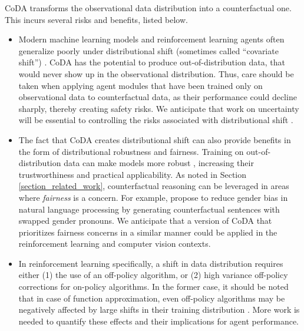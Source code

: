 \documentclass{article}
\begin{document}
CoDA transforms the observational data distribution into a counterfactual one. This incurs several risks and benefits, listed below. 
\begin{itemize}[leftmargin=0.3in,labelsep=0.1in]
\item Modern machine learning models and reinforcement learning agents often generalize poorly under distributional shift (sometimes called ``covariate shift'') \cite{li2018learning,cobbe2018quantifying}. CoDA has the potential to produce out-of-distribution data, that would never show up in the observational distribution. Thus, care should be taken when applying agent modules that have been trained only on observational data to counterfactual data, as their performance could decline sharply, thereby creating safety risks. We anticipate that work on uncertainty will be essential to controlling the risks associated with distributional shift \cite{snoek2019can}.
\item The fact that CoDA creates distributional shift can also provide benefits in the form of distributional robustness and fairness. Training on out-of-distribution data can make models more robust \cite{sinha2017certifying}, increasing their trustworthiness and practical applicability. As noted in Section \ref{section_related_work}, counterfactual reasoning can be leveraged in areas where \emph{fairness} is a concern. For example, \citep{park2018reducing} propose to reduce gender bias in natural language processing by generating counterfactual sentences with swapped gender pronouns. We anticipate that a version of CoDA that prioritizes fairness concerns in a similar manner could be applied in the reinforcement learning and computer vision contexts. 
\item In reinforcement learning specifically, a shift in data distribution requires either (1) the use of an off-policy algorithm, or (2) high variance off-policy corrections for on-policy algorithms. In the former case, it should be noted that in case of function approximation, even off-policy algorithms may be negatively affected by large shifts in their training distribution \cite{sutton2018reinforcement,fu2019diagnosing}. More work is needed to quantify these effects and their implications for agent performance. 
\end{itemize}
\end{document}
